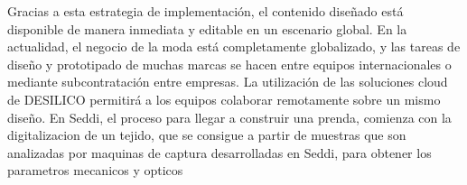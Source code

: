 Gracias a esta estrategia de implementación, el contenido diseñado está disponible de manera inmediata y editable en un escenario global. En la
actualidad, el negocio de la moda está completamente globalizado, y las tareas de diseño y prototipado de muchas marcas se hacen entre equipos
internacionales o mediante subcontratación entre empresas. La  utilización de las soluciones cloud de DESILICO permitirá a los equipos colaborar remotamente sobre un mismo diseño.
En Seddi, el proceso para llegar a construir una prenda, comienza con la digitalizacion de un tejido, que se consigue a partir de muestras que
son analizadas por maquinas de captura desarrolladas en Seddi, para obtener los parametros mecanicos y opticos
